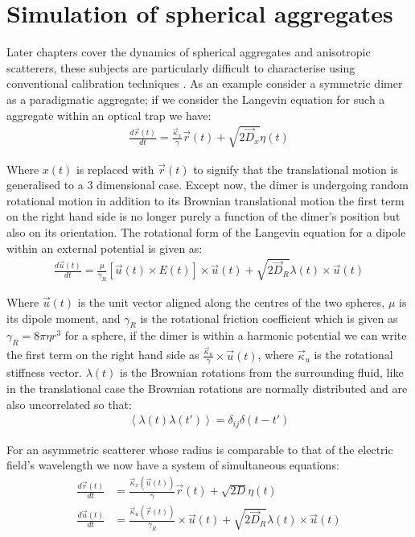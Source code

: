 \section{Simulation of spherical aggregates}

Later chapters cover the dynamics of spherical aggregates and anisotropic 
scatterers, these subjects are particularly difficult to characterise 
using conventional calibration techniques \cite{Li2008, Yogesha2011PreciseCO}. 
As an example consider a symmetric dimer as a paradigmatic aggregate; 
if we consider the Langevin equation for such a aggregate within an optical 
trap we have:
\begin{align}
\frac{{d}\vec{r}(t)}{{dt}} = \frac{\vec{\kappa}_x}{\gamma}\vec{r}(t) + \sqrt{2\vec{D}_x}\eta(t)
\end{align}

Where $x(t)$ is replaced with $\vec{r}(t)$ to signify that the translational 
motion is generalised to a 3 dimensional case. Except now, the dimer 
is undergoing random rotational motion in addition to its Brownian 
translational motion the first term on the right hand side is no longer 
purely a function of the dimer's position but also on its orientation. 
The rotational form of the Langevin equation for a dipole within an external 
potential is given as:
\begin{align}
  \frac{{d}\vec{u}(t)}{{dt}}
  =
  \frac{\mu}{\gamma_R}\left[\vec{u}(t)\times E(t)\right]\times \vec{u}(t)
  + \sqrt{2\vec{D}_R}\lambda(t)\times \vec{u}(t)
\end{align}

Where $\vec{u}(t)$ is the unit vector aligned along the centres of the 
two spheres, $\mu$ is its dipole moment, and $\gamma_R$ is the rotational 
friction coefficient which is given as $\gamma_R = 8\pi\eta r^3$ for a 
sphere, if the dimer is within a harmonic potential we can write the first 
term on the right hand side as $\frac{\vec{\kappa}_u}{\gamma} \times 
\vec{u}(t)$, where $\vec{\kappa}_u$ is the rotational stiffness vector. 
$\lambda(t)$ is the Brownian rotations from the surrounding fluid, 
like in the translational case the Brownian rotations are normally 
distributed and are also uncorrelated so that:
\begin{align}
  \left<\lambda(t)\lambda(t')\right> = \delta_{ij}\delta(t-t')
\end{align}

For an asymmetric scatterer whose radius is comparable to that of the 
electric field's wavelength we now have a system of simultaneous equations:
\begin{align}
	\label{eq:full_langevin}
  \frac{{d}\vec{r}(t)}{{dt}}
  &=
    \frac{\vec{\kappa}_x(\vec{u}(t))}{\gamma}\vec{r}(t) + \sqrt{2D}\eta(t)
  \\
  \frac{{d}\vec{u}(t)}{{dt}}
  &=
    \frac{\vec{\kappa}_u(\vec{r}(t))}{\gamma_R}\times \vec{u}(t)
    + \sqrt{2\vec{D}_R}\lambda(t)\times \vec{u}(t)
\end{align}

